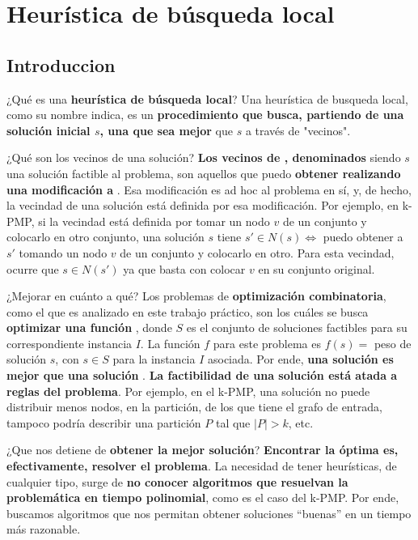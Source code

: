 \documentclass[10pt,a4paper]{article}
\begin{document}
\section{Heurística de búsqueda local}
\subsection{Introduccion}

¿Qué es una \textbf{heurística de búsqueda local}? Una heurística de busqueda local, como su nombre indica, es un \textbf{procedimiento que busca, partiendo de una solución inicial $s$, una que sea mejor} que $s$ a través de "vecinos".

¿Qué son los vecinos de una solución? \textbf{Los vecinos de , denominados } siendo $s$ una solución factible al problema, son aquellos que puedo \textbf{obtener realizando una modificación a }. Esa modificación es ad hoc al problema en sí, y, de hecho, la vecindad de una solución está definida por esa modificación. Por ejemplo, en k-PMP, si la vecindad está definida por tomar un nodo $v$ de un conjunto y colocarlo en otro conjunto, una solución $s$ tiene $s' \in N(s) \Leftrightarrow$ puedo obtener a $s'$ tomando un nodo $v$ de un conjunto y colocarlo en otro. Para esta vecindad, ocurre que $s \in N(s')$ ya que basta con colocar $v$ en su conjunto original.

¿Mejorar en cuánto a qué? Los problemas de \textbf{optimización combinatoria}, como el que es analizado en este trabajo práctico, son los cuáles se busca \textbf{optimizar una función }, donde $S$ es el conjunto de soluciones factibles para su correspondiente instancia $I$. La función $f$ para este problema es $f(s) =$ peso de solución $s$, con $s \in S$ para la instancia $I$ asociada. Por ende, \textbf{una solución  es mejor que una solución }. \textbf{La factibilidad de una solución está atada a reglas del problema}. Por ejemplo, en el k-PMP, una solución no puede distribuir menos nodos, en la partición, de los que tiene el grafo de entrada, tampoco podría describir una partición $P$ tal que $|P| > k$, etc.

¿Que nos detiene de \textbf{obtener la mejor solución}? \textbf{Encontrar la óptima es, efectivamente, resolver el problema}. La necesidad de tener heurísticas, de cualquier tipo, surge de \textbf{no conocer algoritmos que resuelvan la problemática en tiempo polinomial}, como es el caso del k-PMP. Por ende, buscamos algoritmos que nos permitan obtener soluciones ``buenas'' en un tiempo más razonable.
\end{document}
